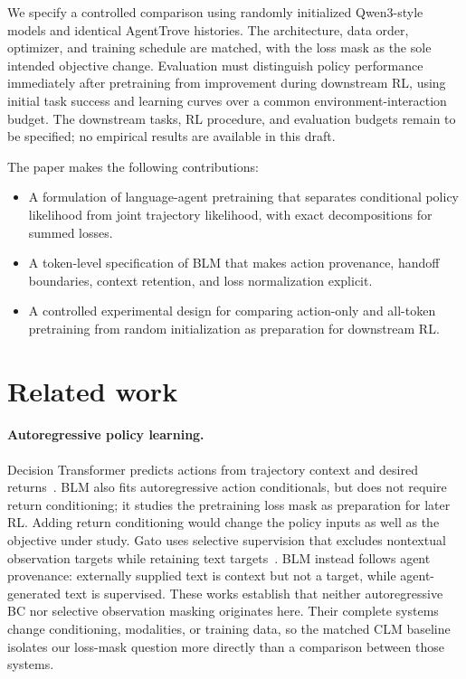 \documentclass{article} %
\begin{document}
We specify a controlled comparison using randomly initialized Qwen3-style models and identical AgentTrove histories. The architecture, data order, optimizer, and training schedule are matched, with the loss mask as the sole intended objective change. Evaluation must distinguish policy performance immediately after pretraining from improvement during downstream RL, using initial task success and learning curves over a common environment-interaction budget. The downstream tasks, RL procedure, and evaluation budgets remain to be specified; no empirical results are available in this draft.

The paper makes the following contributions:
\begin{itemize}
\item A formulation of language-agent pretraining that separates conditional policy likelihood from joint trajectory likelihood, with exact decompositions for summed losses.
\item A token-level specification of BLM that makes action provenance, handoff boundaries, context retention, and loss normalization explicit.
\item A controlled experimental design for comparing action-only and all-token pretraining from random initialization as preparation for downstream RL.
\end{itemize}

\section{Related work}
\paragraph{Autoregressive policy learning.}
Decision Transformer predicts actions from trajectory context and desired returns~\citep{chen2021decision}. BLM also fits autoregressive action conditionals, but does not require return conditioning; it studies the pretraining loss mask as preparation for later RL. Adding return conditioning would change the policy inputs as well as the objective under study. Gato uses selective supervision that excludes nontextual observation targets while retaining text targets~\citep{reed2022generalist}. BLM instead follows agent provenance: externally supplied text is context but not a target, while agent-generated text is supervised. These works establish that neither autoregressive BC nor selective observation masking originates here. Their complete systems change conditioning, modalities, or training data, so the matched CLM baseline isolates our loss-mask question more directly than a comparison between those systems.
\end{document}
